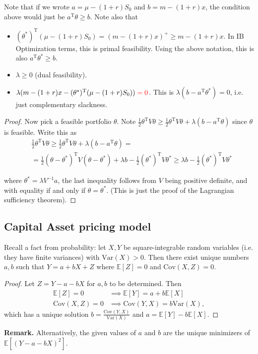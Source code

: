 \documentclass{article}
\theoremstyle{definition}
\begin{document}
Note that if we wrote $a = \mu - (1+r)S_0$ and $b = m-(1+r)x$, the condition above would just be $a^{\text{T}}\theta \ge b$. Note also that
\begin{itemize}
    \item $(\theta^*)^{\text{T}}(\mu-(1+r)S_0) = (m - (1+r)x)^+ \ge  m -(1+r)x.$ \newline In IB Optimization terms, this is primal feasibility. Using the above notation, this is also $a^{\text{T}}\theta^* \ge b$.
    \item $\lambda \ge 0$ (dual feasibility).
    \item $\lambda(m-(1+r)x - (\theta^*)^{\text{T}}(\mu - (1+r)S_0)) \color{red} = 0 \color{black}$. This is $\lambda(b-a^{\text{T}}\theta^*) = 0$, i.e. just complementary slackness.  
\end{itemize}
\begin{proof}
    Now pick a feasible portfolio $\theta$. Note $\frac{1}{2}\theta^{\text{T}} V \theta \ge \frac{1}{2} \theta^{\text{T}} V \theta + \lambda(b - a^{\text{T}}\theta)$ since $\theta$ is feasible. Write this as 
    \begin{align*}
        &\frac{1}{2}\theta^{\text{T}} V \theta \ge \frac{1}{2} \theta^{\text{T}} V \theta + \lambda(b - a^{\text{T}}\theta) =\\ 
        & = \frac{1}{2}(\theta-\theta^*)^{\text{T}} V (\theta-\theta^*) + \lambda b - \frac{1}{2}(\theta^*)^{\text{T}} V \theta^* \ge  \lambda b - \frac{1}{2}(\theta^*)^{\text{T}} V \theta^*   
    \end{align*}
    
    where $\theta^* = \lambda V^{-1} a$, the last inequality follows from $V$ being positive definite, and with equality if and only if $\theta = \theta^*$. (This is just the proof of the Lagrangian sufficiency theorem).
\end{proof}

\subsection{Capital Asset pricing model}
Recall a fact from probability: let $X,Y$ be square-integrable random variables (i.e. they have finite variances) with $\text{Var}(X)>0$. Then there exist unique numbers $a,b$ such that $Y = a + bX + Z$ where $\mathbb{E}[Z]=0$ and $\text{Cov}(X,Z) = 0$.
\begin{proof}
    Let $Z = Y - a - bX$ for $a,b$ to be determined. Then 
    \begin{align*}
        \mathbb{E}[Z] = 0 &\implies \mathbb{E}[Y] =a + b \mathbb{E}[X] \\
        \text{Cov}(X,Z) = 0 &\implies \text{Cov}(Y,X) = b \text{Var}(X),
    \end{align*}
    which has a unique solution $b = \frac{\text{Cov}(Y,X)}{\text{Var}(X)}$ and $a = \mathbb{E}[Y] - b \mathbb{E}[X]$.
\end{proof}
\textbf{Remark.} Alternatively, the given values of $a$ and $b$ are the unique minimizers of $\mathbb{E}[(Y-a-bX)^2]$.
\end{document}
